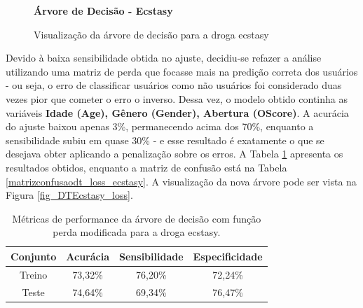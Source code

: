 \documentclass[
	article,			%
	11pt,				%
	oneside,			%
	a4paper,			%
	english,			%
	brazil,				%
	sumario=tradicional
	]{abntex2}
\begin{document}
\begin{figure}[H]
    \centering
    \textbf{Árvore de Decisão - Ecstasy}\par\medskip
    \caption{Visualização da árvore de decisão para a droga ecstasy}
    \label{fig_DTEcstasy}
\end{figure}

\vspace{0.5cm}

Devido à baixa sensibilidade obtida no ajuste, decidiu-se refazer a análise utilizando uma matriz de perda que focasse mais na predição correta dos usuários - ou seja, o erro de classificar usuários como não usuários foi considerado duas vezes pior que cometer o erro o inverso. Dessa vez, o modelo obtido continha as variáveis \textbf{Idade (Age), Gênero (Gender), Abertura (OScore)}. A acurácia do ajuste baixou apenas 3\%, permanecendo acima dos 70\%, enquanto a sensibilidade subiu em quase 30\% - e esse resultado é exatamente o que se desejava obter aplicando a penalização sobre os erros. A Tabela \ref{resultadosdt_loss_ecstasy} apresenta os resultados obtidos, enquanto a matriz de confusão está na Tabela \ref{matrizconfusaodt_loss_ecstasy}. A visualização da nova árvore pode ser vista na Figura \ref{fig_DTEcstasy_loss}.

\vspace{1cm}

\begin{table}[H]
\centering
\begin{tabular}{||c|c|c|c||}
\hline
Conjunto & Acurácia & Sensibilidade & Especificidade \\ \hline
Treino & 73,32\% & 76,20\% & 72,24\% \\ \hline
Teste & 74,64\% & 69,34\% & 76,47\% \\ \hline
\end{tabular}
\caption{Métricas de performance da árvore de decisão com função perda modificada para a droga ecstasy.}
\label{resultadosdt_loss_ecstasy}
\end{table}
\end{document}
